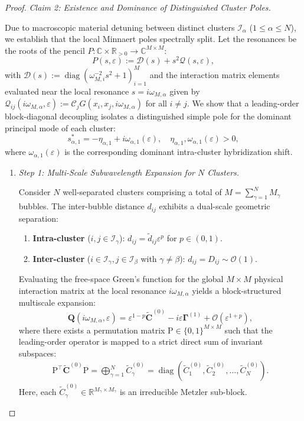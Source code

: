 \documentclass[11pt,a4paper]{article}
\numberwithin{equation}{section}
\begin{document}
\begin{proof}
\item \textit{Claim 2: Existence and Dominance of Distinguished Cluster Poles.}

\medskip
\noindent
Due to macroscopic material detuning between distinct clusters $\mathcal{I}_\alpha$ ($1 \le \alpha \le N$), we establish that the local Minnaert poles spectrally split. Let the resonances be the roots of the pencil $P: \mathbb{C} \times \mathbb{R}_{>0} \to \mathbb{C}^{M \times M}$:
$$P(s, \varepsilon) := \mathcal{D}(s) + s^2 \mathcal{Q}(s, \varepsilon),$$ 
with $\mathcal{D}(s) := \operatorname{diag}(\omega_{M,i}^{-2} s^2 + 1)_{i=1}^M$ and the interaction matrix elements evaluated near the local resonance $s = i\omega_{M,\alpha}$ given by $\mathcal{Q}_{ij}(i\omega_{M,\alpha}, \varepsilon) := \mathcal{C}_j G(x_i, x_j, i\omega_{M,\alpha})$ for all $i \neq j$. We show that a leading-order block-diagonal decoupling isolates a distinguished simple pole for the dominant principal mode of each cluster:
$$s_{\alpha, 1}^\ast = -\eta_{\alpha, 1} + i\omega_{\alpha, 1}(\varepsilon), \quad \eta_{\alpha, 1}, \omega_{\alpha, 1}(\varepsilon) > 0,$$
where $\omega_{\alpha, 1}(\varepsilon)$ is the corresponding dominant intra-cluster hybridization shift.

\begin{enumerate}
\item \textit{Step 1: Multi-Scale Subwavelength Expansion for $N$ Clusters.}

\medskip
\noindent
Consider $N$ well-separated clusters comprising a total of $M = \sum\limits_{\gamma=1}^N M_\gamma$ bubbles. The inter-bubble distance $d_{ij}$ exhibits a dual-scale geometric separation:
\begin{enumerate}
    \item \textbf{Intra-cluster} ($i, j \in \mathcal{I}_\gamma$): $d_{ij} = \widetilde{d}_{ij}\varepsilon^p$ for $p \in (0,1)$.
    \item \textbf{Inter-cluster} ($i \in \mathcal{I}_\gamma, j \in \mathcal{I}_\beta$ with $\gamma \neq \beta$): $d_{ij} = D_{ij} \sim \mathcal{O}(1)$.
\end{enumerate}
Evaluating the free-space Green's function for the global $M \times M$ physical interaction matrix at the local resonance $i\omega_{M,\alpha}$ yields a block-structured multiscale expansion:
$$ \mathbf{Q}(i\omega_{M,\alpha}, \varepsilon) = \varepsilon^{1-p} \widetilde{\mathbf{C}}^{(0)} - i\varepsilon \mathbf{\Gamma}^{(1)} + \mathcal{O}(\varepsilon^{1+p}), $$
where there exists a permutation matrix $\bm{\mathrm{P}}\in \{0,1\}^{M\times M}$ such that the leading-order operator is mapped to a strict direct sum of invariant subspaces:
\begin{align}
    \bm{\mathrm{P}}^\top \widetilde{\mathbf{C}}^{(0)} \bm{\mathrm{P}} = \bigoplus_{\gamma=1}^N \widetilde{C}_\gamma^{(0)} = \operatorname{diag}(\widetilde{C}_1^{(0)}, \widetilde{C}_2^{(0)}, \dots, \widetilde{C}_N^{(0)}).
\end{align}
Here, each $\widetilde{C}_\gamma^{(0)} \in \mathbb{R}^{M_\gamma\times M_\gamma}$ is an irreducible Metzler sub-block.


\end{enumerate}
\end{proof}
\end{document}
